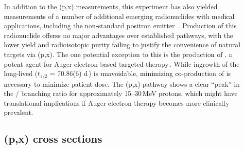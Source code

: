 In addition to the (p,x) measurements, this experiment has also yielded measurements of  a number of additional  emerging radionuclides with medical applications,
including the non-standard positron emitter 
\,\cite{Thisgaard2011,Zaman1996,Hermanne2000a}.
Production of this radionuclide offerss no major advantages over established pathways, with the  lower yield and radioisotopic purity failing to justify the convenience of natural targets  via   (p,x).
The one potential exception to this is the production of , a potent agent for Auger electron-based targeted therapy\,\cite{Thisgaard2011a,Valdovinos2017b,Thisgaard2014a}.
While ingrowth of the long-lived  ($t_{1/2}$ = 70.86(6) d\,\cite{Nesaraja2010}) is unavoidable, minimizing co-production of  is necessary to minimize patient dose.
The (p,x) pathway shows a clear \enquote{peak} in the / branching ratio for approximately 15--30\,MeV protons, which might have translational implications if Auger electron therapy becomes more clinically prevalent. 




\subsection{(p,x) cross sections}



